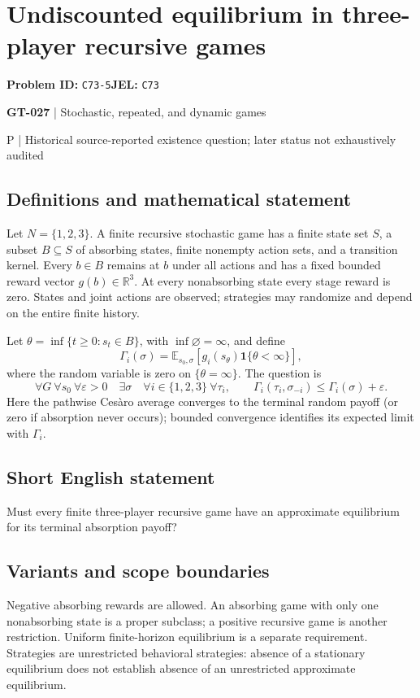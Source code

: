 \documentclass[11pt,a4paper]{article}
\begin{document}
\section*{Undiscounted equilibrium in three-player recursive games}
\textbf{Problem ID:} \texttt{C73-5}\quad \textbf{JEL:} \texttt{C73}\par
\label{problem:OP-0157}
\label{game:GT-027}
{\sffamily\small\color{muted}
{\sffamily\small\color{muted}\textbf{GT-027} | Stochastic, repeated, and dynamic games\par P | Historical source-reported existence question; later status not exhaustively audited\par}
\par}
\subsection*{Definitions and mathematical statement}
Let $N=\{1,2,3\}$. A finite recursive stochastic game has a finite state set $S$, a subset $B\subseteq S$ of absorbing states, finite nonempty action sets, and a transition kernel. Every $b\in B$ remains at $b$ under all actions and has a fixed bounded reward vector $g(b)\in\mathbb R^3$. At every nonabsorbing state every stage reward is zero. States and joint actions are observed; strategies may randomize and depend on the entire finite history.

Let $\theta=\inf\{t\geq0:s_t\in B\}$, with $\inf\varnothing=\infty$, and define
\[
 \Gamma_i(\sigma)=\mathbb E_{s_0,\sigma}
 \left[g_i(s_\theta)\mathbf1\{\theta<\infty\}\right],
\]
where the random variable is zero on $\{\theta=\infty\}$. The question is
\[
 \forall G\ \forall s_0\ \forall\varepsilon>0\quad
 \exists\sigma\quad\forall i\in\{1,2,3\}\ \forall\tau_i,\qquad
 \Gamma_i(\tau_i,\sigma_{-i})\leq\Gamma_i(\sigma)+\varepsilon.
\]
Here the pathwise Ces\`aro average converges to the terminal random payoff (or zero if absorption never occurs); bounded convergence identifies its expected limit with $\Gamma_i$.
\subsection*{Short English statement}
Must every finite three-player recursive game have an approximate equilibrium for its terminal absorption payoff?
\subsection*{Variants and scope boundaries}
Negative absorbing rewards are allowed. An absorbing game with only one nonabsorbing state is a proper subclass; a positive recursive game is another restriction. Uniform finite-horizon equilibrium is a separate requirement. Strategies are unrestricted behavioral strategies: absence of a stationary equilibrium does not establish absence of an unrestricted approximate equilibrium.
\end{document}
